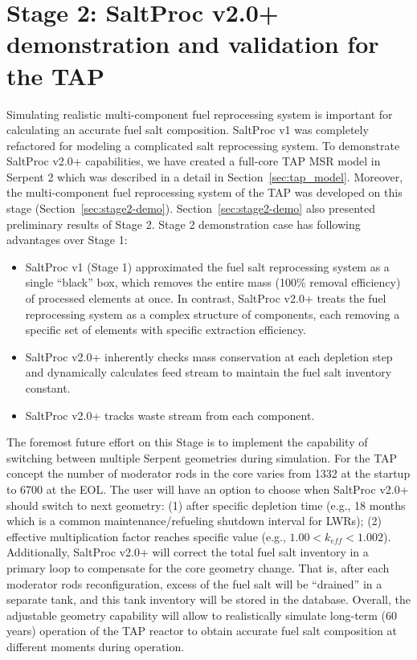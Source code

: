 \section{Stage 2: SaltProc v2.0+ demonstration and validation for the TAP}
Simulating realistic multi-component fuel reprocessing system is important for 
calculating an accurate fuel salt composition. SaltProc v1 was completely 
refactored for modeling a complicated salt reprocessing system. To demonstrate 
SaltProc v2.0+ capabilities, we have created a full-core \gls{TAP} 
\gls{MSR} model in Serpent 2 \cite{chaube_tap_2019} which was described in a 
detail in Section~\ref{sec:tap_model}. Moreover, the multi-component fuel 
reprocessing system of the \gls{TAP} was developed on this stage 
(Section~\ref{sec:stage2-demo}). Section~\ref{sec:stage2-demo} also presented 
preliminary results of Stage 2. Stage 2 demonstration case has following 
advantages over Stage 1:
\begin{itemize}
	\item SaltProc v1 (Stage 1) approximated the fuel salt reprocessing system 
	as a single ``black'' box, which removes the entire mass (100\% removal 
	efficiency) of processed elements at once. In contrast, SaltProc v2.0+ 
	treats the fuel reprocessing system as a complex structure of components, 
	each removing a specific set of elements with specific extraction 
	efficiency. 
	\item SaltProc v2.0+ inherently checks mass conservation at each depletion 
	step and dynamically calculates feed stream to maintain the fuel salt 
	inventory constant.
	\item SaltProc v2.0+ tracks waste stream from each component.
\end{itemize}

The foremost future effort on this Stage is to implement the capability of 
switching between multiple Serpent geometries during simulation. For the 
\gls{TAP} concept the number of moderator rods in the core varies from 1332 at 
the startup to 6700 at the \gls{EOL}. The user will have an option to choose 
when SaltProc v2.0+ should switch to next geometry: (1) after specific 
depletion  time (e.g., 18 months which is a common maintenance/refueling 
shutdown interval for \glspl{LWR}); (2) effective multiplication factor 
reaches specific value (e.g., $1.00<k_{eff} < 1.002$). Additionally, SaltProc 
v2.0+ will correct the total fuel salt inventory in a primary loop to 
compensate for the core geometry change. That is, after each moderator rods  
reconfiguration, excess of the fuel salt will be ``drained'' in a separate 
tank, and this tank inventory will be stored in the database. Overall, the 
adjustable geometry capability will allow to realistically simulate long-term 
(60 years) operation of the \gls{TAP} reactor to obtain accurate fuel salt 
composition at different moments during operation.

